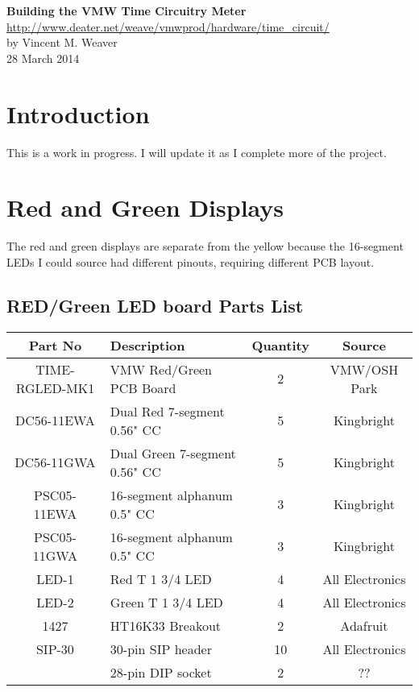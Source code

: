 \documentclass[11pt]{article}
\begin{document}
\begin{center}
{\Large \bf Building the VMW Time Circuitry Meter}\\
\url{http://www.deater.net/weave/vmwprod/hardware/time_circuit/}\\
by Vincent M. Weaver\\
28 March 2014
\end{center}


\section{Introduction}

This is a work in progress.  I will update it as I complete more
of the project.


\pagebreak
\section{Red and Green Displays}

The red and green displays are separate from the yellow because
the 16-segment LEDs I could source had different pinouts, requiring
different PCB layout.

\subsection{RED/Green LED board Parts List}

\begin{tabular}{|c|l|c|c|}
\hline
Part No   &  Description    &  Quantity    &   Source \\
\hline
\hline
TIME-RGLED-MK1 & VMW Red/Green PCB Board       & 2 & VMW/OSH Park\\ %
\hline
DC56-11EWA     & Dual Red 7-segment 0.56" CC   & 5 & Kingbright\\ %
\hline
DC56-11GWA     & Dual Green 7-segment 0.56" CC & 5 & Kingbright\\ %
\hline
PSC05-11EWA    & 16-segment alphanum 0.5" CC   & 3 & Kingbright\\ %
\hline
PSC05-11GWA    & 16-segment alphanum 0.5" CC   & 3 & Kingbright\\ %
\hline
LED-1          & Red T 1 3/4 LED               & 4 & All Electronics\\ %
\hline
LED-2          & Green T 1 3/4 LED             & 4 & All Electronics\\ %
\hline
1427           & HT16K33 Breakout              & 2 & Adafruit\\ %
\hline
SIP-30	       & 30-pin SIP header             & 10 & All Electronics\\ %
\hline
               & 28-pin DIP socket             & 2 & ?? \\ %
\hline
\end{tabular}
\end{document}
